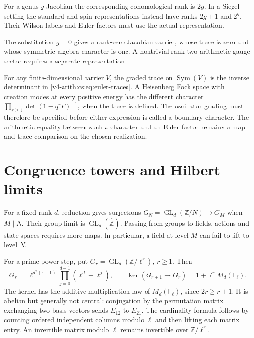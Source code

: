 For a genus-\(g\) Jacobian the corresponding cohomological rank is \(2g\).
In a Siegel setting the standard and spin representations instead have ranks
\(2g+1\) and \(2^g\). Their Wilson labels and Euler factors must use the
actual representation.

The substitution \(g=0\) gives a rank-zero Jacobian carrier, whose trace is
zero and whose symmetric-algebra character is one. A nontrivial rank-two
arithmetic gauge sector requires a separate representation.

For any finite-dimensional carrier \(V\), the graded trace on
\(\operatorname{Sym}(V)\) is the inverse determinant in
\eqref{v4-arith:cs:eq:euler-traces}. A Heisenberg Fock space with creation
modes at every positive energy has the different character
\(\prod_{r\ge1}\det(1-q^rF)^{-1}\), when the trace is defined. The
oscillator grading must therefore be specified before either expression is
called a boundary character. The arithmetic equality between such a
character and an Euler factor remains a map and trace comparison on the
chosen realization.

\section{Congruence towers and Hilbert limits}
\label{v4-arith:cs:towers}

For a fixed rank \(d\), reduction gives surjections
\(G_N=\operatorname{GL}_d(\mathbb Z/N)\to G_M\) when \(M\mid N\). Their
group limit is \(\operatorname{GL}_d(\widehat{\mathbb Z})\). Passing from
groups to fields, actions and state spaces requires more maps. In
particular, a field at level \(M\) can fail to lift to level \(N\).

For a prime-power step, put \(G_r=\operatorname{GL}_d(\mathbb Z/\ell^r)\),
\(r\ge1\). Then
\begin{equation}
 |G_r|=\ell^{d^2(r-1)}
                  \prod_{j=0}^{d-1}(\ell^d-\ell^j),
 \qquad
 \ker(G_{r+1}\to G_r)=1+\ell^rM_d(\mathbb F_\ell).
 \label{v4-arith:cs:eq:congruence}
\end{equation}
The kernel has the additive multiplication law of \(M_d(\mathbb F_\ell)\),
since \(2r\ge r+1\). It is abelian but generally not central: conjugation by
the permutation matrix exchanging two basis vectors sends \(E_{12}\) to
\(E_{21}\). The cardinality formula follows by counting ordered independent
columns modulo \(\ell\) and then lifting each matrix entry. An invertible
matrix modulo \(\ell\) remains invertible over \(\mathbb Z/\ell^r\).

